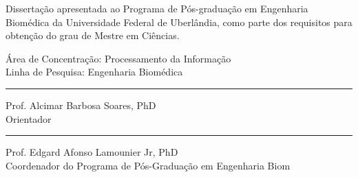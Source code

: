 
\newpage
\thispagestyle{empty}   %
\begin{center}
{\bf \large{\@author}}
\vskip 110pt
{\bf \large{\@titulo}}
\vskip 70pt
\end{center}

\hfill                                                         %
\begin{minipage}{12cm}
Dissertação apresentada ao Programa de Pós-graduação em
Engenharia Biomédica da Universidade Federal de Uberlândia,
como parte dos requisitos para obtenção do grau de Mestre
em Ciências.

\vskip 20pt
Área de Concentração: Processamento da Informação \\
Linha de Pesquisa: Engenharia Biomédica

\vskip 30pt
\begin{flushleft}
\rule{11cm}{0.2mm}
\end{flushleft}
\vspace{-0.5cm}
Prof. Alcimar Barbosa Soares, PhD \\ Orientador
\vskip 2pt
\begin{flushleft}
\rule{11cm}{0.2mm}
\end{flushleft}
Prof. Edgard Afonso Lamounier Jr, PhD \\ Coordenador do Programa de Pós-Graduação em Engenharia Biom
\vspace{-0.5cm}

\end{minipage}

\vfill
\begin{center}
\@city \\ \@year
\end{center}
